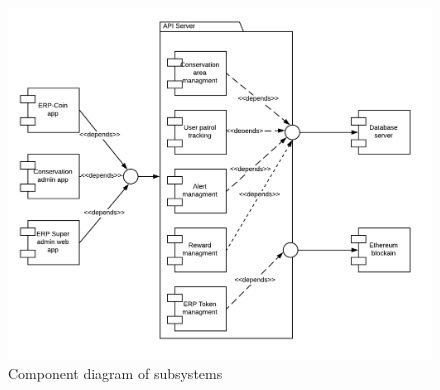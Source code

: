 \documentclass{article}
\begin{document}
\vspace{1em}
\begin{figure}[h]
\centering

\includegraphics[scale=0.7]{ComponentDiagram.png}
\caption{Component diagram of subsystems}
\end{figure}
\vspace{1em}
\end{document}
